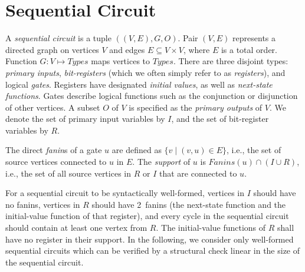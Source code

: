 \section{Sequential Circuit}
\label{sec:sequential}
%

%
\begin{definition}
A {\em sequential circuit} is a tuple $\left( (V, E),G,
O\right)$.
Pair $(V,E)$ represents a directed graph on
vertices $V$ and edges $E \subseteq V\times V$, where $E$
is a total order.  Function $G: V \mapsto
\mathit{Types}$ maps vertices to $\mathit{Types}$.
There are three disjoint types: {\em primary inputs}, {\em
bit-registers} (which we often simply refer to as {\em
registers}), and logical {\em gates}.  Registers have designated
{\em initial values}, as well as {\em next-state
functions}.  Gates describe logical functions such as
the conjunction or disjunction of other vertices. 
A subset $O$ of $V$ is specified as the {\em
primary outputs} of $V$.  
We denote the set of primary input variables by $I$,
and the set of bit-register variables by $R$.  
\label{def:back:seq_circuit}
\end{definition}
%
\begin{definition}
The direct \emph{fanin}s of a gate $u$ 
are defined as
$\{v \mid (v,u)\in E\}$, i.e., the set of source vertices connected
to $u$ in $E$.  
The {\em support} of $u$ 
is $\mathit{Fanins}(u) \cap (I \cup R)$, i.e., the set of all 
  source vertices in $R$ or $I$ that are connected to $u$.
\label{def:back:fanins} 
\end{definition}
%
%
For a sequential
circuit to be syntactically well-formed, vertices in $I$
should have no fanins, vertices in $R$ should have
2~fanins (the next-state function and the initial-value
function of that register), %
and every cycle in the sequential circuit should contain
at least one vertex from $R$.  The initial-value functions
of $R$ shall have no register in their support.  
In the following, 
we consider only well-formed sequential circuits which can be 
verified by a structural check linear in the size of the 
sequential circuit.
%


